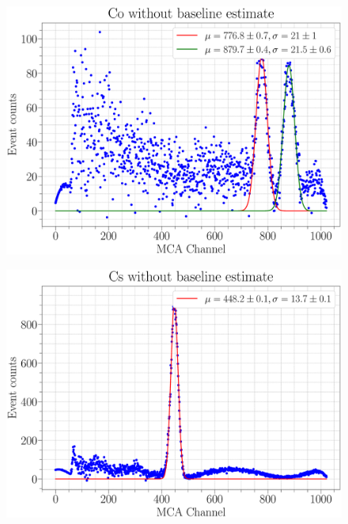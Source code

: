 \documentclass[a4paper,12pt]{article}
\begin{document}
\begin{figure}[H]
	\centering
	\includegraphics[scale=0.25]{../Figures/Co_nobaseline.eps}
	\caption{}
	\label{Eu_raw}
\end{figure}

\begin{figure}[H]
	\centering
	\includegraphics[scale=0.25]{../Figures/Cs_nobaseline.eps}
	\caption{}
	\label{Eu_raw}
\end{figure}
\end{document}
